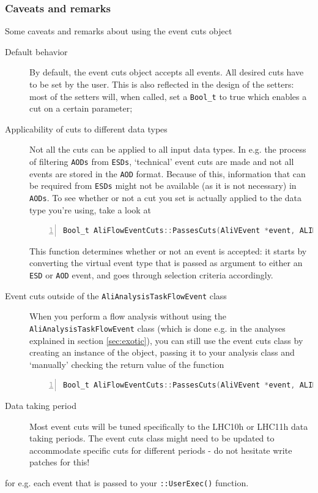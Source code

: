 \documentclass[a4paper]{book}
\numberwithin{equation}{subsection}
\begin{document}
\subsubsection{Caveats and remarks}  
Some caveats and remarks about using the event cuts object
\begin{description}
\item[Default behavior] By default, the event cuts object accepts all events. All desired cuts have to be set by the user. This is also reflected in the design of the setters: most of the setters will, when called, set a \texttt{Bool\_t} to true which enables a cut on a certain parameter;
\item[Applicability of cuts to different data types] Not all the cuts can be applied to all input data types. In e.g. the process of filtering \texttt{AODs} from \texttt{ESDs}, `technical' event cuts are made and not all events are stored in the \texttt{AOD} format. Because of this, information that can be required from \texttt{ESDs} might not be available (as it is not necessary) in \texttt{AODs}. To see whether or not a cut you set is actually applied to the data type you're using, take a look at
\begin{lstlisting}[language=C, numbers=left]
Bool_t AliFlowEventCuts::PassesCuts(AliVEvent *event, ALIMCEvent *mcevent)\end{lstlisting}
This function determines whether or not an event is accepted: it starts by converting the virtual event type that is passed as argument to either an \texttt{ESD} or \texttt{AOD} event, and goes through selection criteria accordingly. 
\item[Event cuts outside of the \texttt{AliAnalysisTaskFlowEvent} class]
When you perform a flow analysis without using the \texttt{AliAnalysisTaskFlowEvent} class (which is done e.g. in the analyses explained in section \ref{sec:exotic}), you can still use the event cuts class by creating an instance of the object, passing it to your analysis class and `manually' checking the return value of the function 
\begin{lstlisting}[language=C, numbers=left]
Bool_t AliFlowEventCuts::PassesCuts(AliVEvent *event, ALIMCEvent *mcevent)\end{lstlisting}
\item[Data taking period] Most event cuts will be tuned specifically to the LHC10h or LHC11h data taking periods. The event cuts class might need to be updated to accommodate specific cuts for different periods - do not hesitate write patches for this!
\end{description}
for e.g. each event that is passed to your \texttt{::UserExec()} function.
\end{document}
